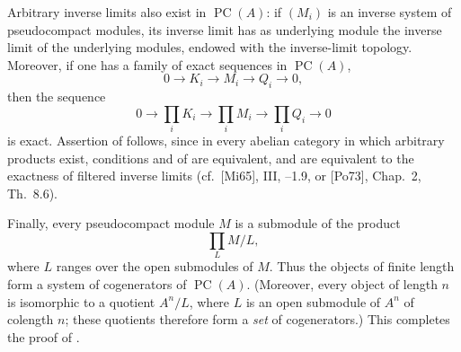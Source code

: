 Arbitrary inverse limits also exist in \(\operatorname{PC}(A)\): if
\((M_i)\) is an inverse system of pseudocompact modules, its inverse
limit has as
underlying module the inverse limit of the underlying
modules, endowed with the inverse-limit topology. Moreover, if one
has a family of exact sequences in \(\operatorname{PC}(A)\),
\[
  0\longrightarrow K_i\longrightarrow M_i
  \longrightarrow Q_i\longrightarrow 0,
\]
then the sequence
\[
  0\longrightarrow\prod_i K_i\longrightarrow\prod_i M_i
  \longrightarrow\prod_i Q_i\longrightarrow 0
\]
is exact. Assertion \textup{} of  follows, since in every
abelian category in which arbitrary products exist, conditions
\textup{} and \textup{} of  are equivalent, and are
equivalent to the exactness of filtered inverse limits
(\textup{cf.}\ [Mi65], III, --1.9, or [Po73], Chap.~2,
Th.~8.6).

Finally, every pseudocompact module \(M\) is a submodule of the
product
\[
  \prod_L M/L,
\]
where \(L\) ranges over the open submodules of \(M\). Thus the objects
of finite length form a system of cogenerators of
\(\operatorname{PC}(A)\). (Moreover, every object of length \(n\) is
isomorphic to a quotient \(A^n/L\), where \(L\) is an open submodule
of \(A^n\) of colength \(n\); these quotients therefore form a
\emph{set} of cogenerators.) This completes the proof of .

